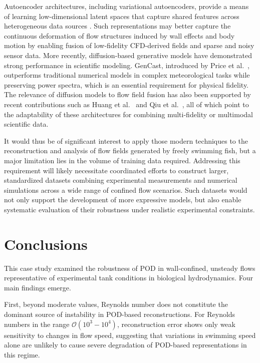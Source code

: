 \documentclass[preprint,12pt]{elsarticle}
\begin{document}
Autoencoder architectures, including variational autoencoders, provide a means of learning low-dimensional latent spaces that capture shared features across heterogeneous data sources \citep{Su2024}. Such representations may better capture the continuous deformation of flow structures induced by wall effects and body motion by enabling fusion of low-fidelity CFD-derived fields and sparse and noisy sensor data. More recently, diffusion-based generative models have demonstrated strong performance in scientific modeling. GenCast, introduced by Price et al.~\citep{Price2025}, outperforms traditional numerical models in complex meteorological tasks while preserving power spectra, which is an essential requirement for physical fidelity. The relevance of diffusion models to flow field fusion has also been supported by recent contributions such as Huang et al.~\citep{Huang2024} and Qiu et al.~\citep{Qiu2024}, all of which point to the adaptability of these architectures for combining multi-fidelity or multimodal scientific data.

It would thus be of significant interest to apply those modern techniques to the reconstruction and analysis of flow fields generated by freely swimming fish, but a major limitation lies in the volume of training data required. Addressing this requirement will likely necessitate coordinated efforts to construct larger, standardized datasets combining experimental measurements and numerical simulations across a wide range of confined flow scenarios. Such datasets would not only support the development of more expressive models, but also enable systematic evaluation of their robustness under realistic experimental constraints.

\section{Conclusions}
\label{sec6}
This case study examined the robustness of POD in wall-confined, unsteady flows representative of experimental tank conditions in biological hydrodynamics. Four main findings emerge.

First, beyond moderate values, Reynolds number does not constitute the dominant source of instability in POD-based reconstructions. For Reynolds numbers in the range $\mathcal{O}(10^3-10^4)$, reconstruction error shows only weak sensitivity to changes in flow speed, suggesting that variations in swimming speed alone are unlikely to cause severe degradation of POD-based representations in this regime.
\end{document}
